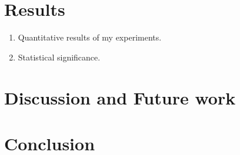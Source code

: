 \section{Results}
\label{sec:results}

\begin{enumerate}
    \item Quantitative results of my experiments. 
    \item Statistical significance.
\end{enumerate}



\section{Discussion and Future work}
\label{sec:discussion}


\section{Conclusion}
\label{sec:conclusion}
